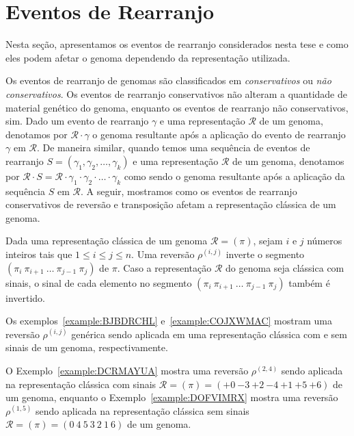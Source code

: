 \section{Eventos de Rearranjo}

Nesta seção, apresentamos os eventos de rearranjo considerados nesta tese e como eles podem afetar o genoma dependendo da representação utilizada. 

Os eventos de rearranjo de genomas são classificados em \emph{conservativos} ou \emph{não conservativos}. Os eventos de rearranjo conservativos não alteram a quantidade de material genético do genoma, enquanto os eventos de rearranjo não conservativos, sim. Dado um evento de rearranjo $\gamma$ e uma representação $\mathcal{R}$ de um genoma, denotamos por $\mathcal{R} \cdot  \gamma$ o genoma resultante após a aplicação do evento de rearranjo $\gamma$ em $\mathcal{R}$. De maneira similar, quando temos uma sequência de eventos de rearranjo $S=(\gamma_1,\gamma_2,\dots,\gamma_k)$ e uma representação $\mathcal{R}$ de um genoma, denotamos por $\mathcal{R} \cdot S = \mathcal{R} \cdot \gamma_1 \cdot \gamma_2 \cdot \ldots \cdot \gamma_k$ como sendo o genoma resultante após a aplicação da sequência $S$ em $\mathcal{R}$. A seguir, mostramos como os eventos de rearranjo conservativos de reversão e transposição afetam a representação clássica de um genoma.

\begin{definition}
Dada uma representação clássica de um genoma $\mathcal{R} = (\pi)$, sejam $i$ e $j$ números inteiros tais que $1 \le i \le j \le n$. Uma reversão $\rho^{(i,j)}$ inverte o segmento $(\pi_i~\pi_{i+1}~\dots~\pi_{j-1}~\pi_j)$ de $\pi$. Caso a representação $\mathcal{R}$ do genoma seja clássica com sinais, o sinal de cada elemento no segmento $(\pi_i~\pi_{i+1}~\dots~\pi_{j-1}~\pi_j)$ também é invertido.
\end{definition}

Os exemplos~\ref{example:BJBDRCHL} e~\ref{example:COJXWMAC} mostram uma reversão $\rho^{(i,j)}$ genérica sendo aplicada em uma representação clássica com e sem sinais de um genoma, respectivamente.





O Exemplo~\ref{example:DCRMAYUA} mostra uma reversão $\rho^{(2,4)}$ sendo aplicada na representação clássica com sinais $\mathcal{R} = (\pi) = ({+0}~{-3}~{+2}~{-4}~{+1}~{+5}~{+6})$ de um genoma, enquanto o Exemplo~\ref{example:DOFVIMRX} mostra uma reversão $\rho^{(1,5)}$ sendo aplicada na representação clássica sem sinais $\mathcal{R} = (\pi) = ({0}~{4}~{5}~{3}~{2}~{1}~{6})$ de um genoma.

